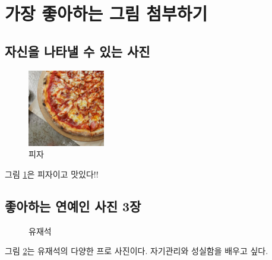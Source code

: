 \documentclass[a4paper]{article}
\begin{document}
\section{가장 좋아하는 그림 첨부하기}
\subsection{자신을 나타낼 수 있는 사진}
\begin{figure}[h]
\begin{center}
\includegraphics[width=0.3\textwidth]{pizza}
\caption{피자}
\label{fig:fig1}
\end{center}
\end{figure}
그림 \ref{fig:fig1}은 피자이고 맛있다!!

\subsection{좋아하는 연예인 사진 3장}
\begin{figure}[h]
\caption{유재석}
\label{fig:fig2}
\end{figure}
그림 \ref{fig:fig2}는 유재석의 다양한 프로 사진이다. 자기관리와 성실함을 배우고 싶다.
\newpage
\end{document}
